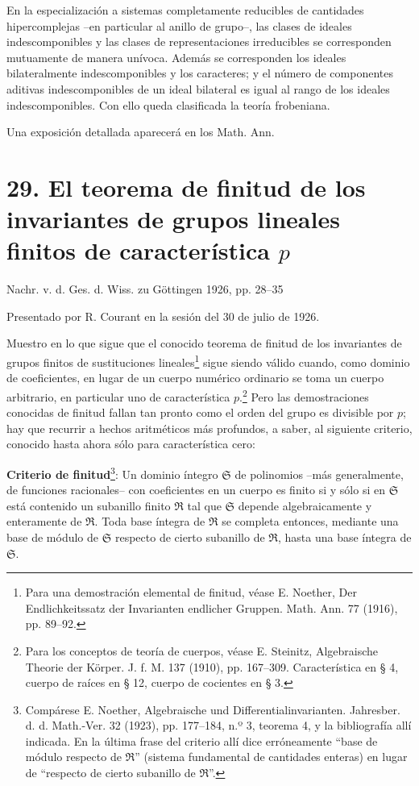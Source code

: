 \documentclass[11pt]{article}
\begin{document}
En la especialización a sistemas completamente reducibles de cantidades hipercomplejas --en particular al anillo de grupo--, las clases de ideales indescomponibles y las clases de representaciones irreducibles se corresponden mutuamente de manera unívoca. Además se corresponden los ideales bilateralmente indescomponibles y los caracteres; y el número de componentes aditivas indescomponibles de un ideal bilateral es igual al rango de los ideales indescomponibles. Con ello queda clasificada la teoría frobeniana.

Una exposición detallada aparecerá en los Math. Ann.

\section*{29. El teorema de finitud de los invariantes de grupos lineales finitos de característica $p$}

\begin{center}
Nachr. v. d. Ges. d. Wiss. zu Göttingen 1926, pp. 28--35
\end{center}

Presentado por R. Courant en la sesión del 30 de julio de 1926.

Muestro en lo que sigue que el conocido teorema de finitud de los invariantes de grupos finitos de sustituciones lineales\footnote{Para una demostración elemental de finitud, véase E. Noether, Der Endlichkeitssatz der Invarianten endlicher Gruppen. Math. Ann. 77 (1916), pp. 89--92.} sigue siendo válido cuando, como dominio de coeficientes, en lugar de un cuerpo numérico ordinario se toma un cuerpo arbitrario, en particular uno de característica $p$.\footnote{Para los conceptos de teoría de cuerpos, véase E. Steinitz, Algebraische Theorie der Körper. J. f. M. 137 (1910), pp. 167--309. Característica en § 4, cuerpo de raíces en § 12, cuerpo de cocientes en § 3.} Pero las demostraciones conocidas de finitud fallan tan pronto como el orden del grupo es divisible por $p$; hay que recurrir a hechos aritméticos más profundos, a saber, al siguiente criterio, conocido hasta ahora sólo para característica cero:

\textbf{Criterio de finitud}\footnote{Compárese E. Noether, Algebraische und Differentialinvarianten. Jahresber. d. d. Math.-Ver. 32 (1923), pp. 177--184, n.º 3, teorema 4, y la bibliografía allí indicada. En la última frase del criterio allí dice erróneamente ``base de módulo respecto de $\mathfrak R$'' (sistema fundamental de cantidades enteras) en lugar de ``respecto de cierto subanillo de $\mathfrak R$''.}: Un dominio íntegro $\mathfrak S$ de polinomios --más generalmente, de funciones racionales-- con coeficientes en un cuerpo es finito si y sólo si en $\mathfrak S$ está contenido un subanillo finito $\mathfrak R$ tal que $\mathfrak S$ depende algebraicamente y enteramente de $\mathfrak R$. Toda base íntegra de $\mathfrak R$ se completa entonces, mediante una base de módulo de $\mathfrak S$ respecto de cierto subanillo de $\mathfrak R$, hasta una base íntegra de $\mathfrak S$.
\end{document}
